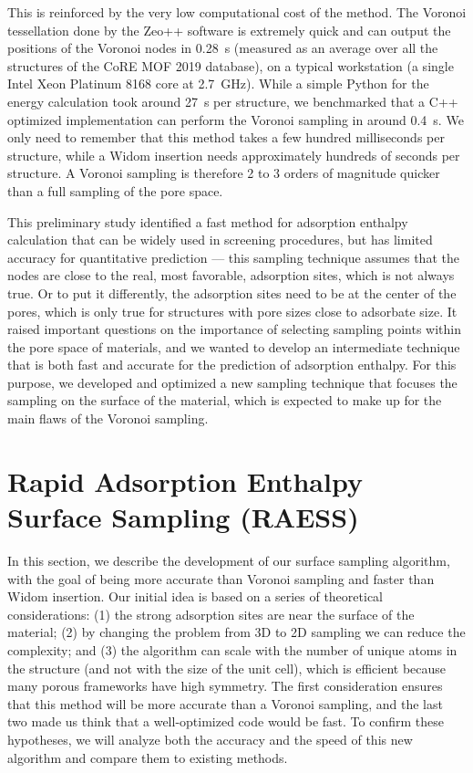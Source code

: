 \documentclass[main]{subfiles}
\begin{document}
This is reinforced by the very low computational cost of the method. The Voronoi tessellation done by the Zeo++ software is extremely quick and can output the positions of the Voronoi nodes in \SI{0.28}{\second} (measured as an average over all the structures of the CoRE MOF 2019 database), on a typical workstation (a single Intel Xeon Platinum 8168 core at 2.7~\si{\giga\hertz}). While a simple Python for the energy calculation took around \SI{27}{\second} per structure, we benchmarked that a C++ optimized implementation can perform the Voronoi sampling in around \SI{0.4}{\second}. We only need to remember that this method takes a few hundred milliseconds per structure, while a Widom insertion needs approximately hundreds of seconds per structure. A Voronoi sampling is therefore 2 to 3 orders of magnitude quicker than a full sampling of the pore space.

This preliminary study identified a fast method for adsorption enthalpy calculation that can be widely used in screening procedures, but has limited accuracy for quantitative prediction --- this sampling technique assumes that the nodes are close to the real, most favorable, adsorption sites, which is not always true. Or to put it differently, the adsorption sites need to be at the center of the pores, which is only true for structures with pore sizes close to adsorbate size. It raised important questions on the importance of selecting sampling points within the pore space of materials, and we wanted to develop an intermediate technique that is both fast and accurate for the prediction of adsorption enthalpy. For this purpose, we developed and optimized a new sampling technique that focuses the sampling on the surface of the material, which is expected to make up for the main flaws of the Voronoi sampling.

\section{Rapid Adsorption Enthalpy Surface Sampling (RAESS)}

In this section, we describe the development of our surface sampling algorithm, with the goal of being more accurate than Voronoi sampling and faster than Widom insertion. Our initial idea is based on a series of theoretical considerations: (1) the strong adsorption sites are near the surface of the material; (2) by changing the problem from 3D to 2D sampling we can reduce the complexity; and (3) the algorithm can scale with the number of unique atoms in the structure (and not with the size of the unit cell), which is efficient because many porous frameworks have high symmetry. The first consideration ensures that this method will be more accurate than a Voronoi sampling, and the last two made us think that a well-optimized code would be fast. To confirm these hypotheses, we will analyze both the accuracy and the speed of this new algorithm and compare them to existing methods.
\end{document}
